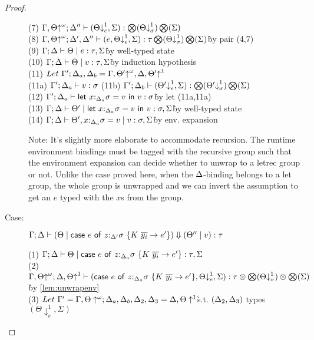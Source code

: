 \documentclass[acmsmall,review,anonymous,screen]{acmart}
\newcommand{\llet}[2]{\mathsf{let}~#1~\mathsf{in}~#2}
\newcommand{\ccase}[2]{\mathsf{case}~#1~\mathsf{of}~#2}
\begin{document}
\begin{proof}
\begin{description}
\begin{tabbing}
    (7) $\Gamma, \Theta{\uparrow}^\omega; \Delta'' \vdash (\Theta{\downarrow}^1_e, \Sigma) : \bigotimes(\Theta{\downarrow}^1_\sigma) \bigotimes(\Sigma)$\\
    (8) $\Gamma, \Theta{\uparrow}^\omega; \Delta', \Delta'' \vdash (e, \Theta{\downarrow}^1_e, \Sigma) : \tau \bigotimes(\Theta{\downarrow}^1_\sigma) \bigotimes(\Sigma)$\` by pair (4,7)\\
    (9) $\Gamma; \Delta \vdash \Theta \mid e : \tau,\Sigma$\` by well-typed state\\
    (10) $\Gamma; \Delta \vdash \Theta \mid v : \tau,\Sigma$\` by induction hypothesis\\
    (11) $Let~\Gamma';\Delta_a,\Delta_b = \Gamma, \Theta'{\uparrow}^\omega, \Delta, \Theta'{\uparrow}^1$\\
    (11a) $\Gamma'; \Delta_a \vdash v : \sigma$
    (11b) $\Gamma'; \Delta_b \vdash (\Theta'{\downarrow}^1_e, \Sigma) : \bigotimes(\Theta'{\downarrow}^1_\sigma) \bigotimes(\Sigma)$\\
    (12) $\G'; \D_a \vdash \llet{x{:}_{\D_a}\s = v}{v} : \s$\`by let (11a,11a)\\
    (13) $\G; \D \vdash \Theta' \mid \llet{x{:}_{\D_a}\s = v}{v} : \s, \Sigma$\`by well-typed state\\
    (14) $\Gamma; \Delta \vdash \Theta', x{:}_{\Delta_a}\sigma = v \mid v : \sigma, \Sigma$\`by env. expansion\\
\end{tabbing}
Note: It's slightly more elaborate to accommodate recursion. The runtime
environment bindings must be tagged with the recursive group such that the
environment expansion can decide whether to unwrap to a letrec group or
not. Unlike the case proved here, when the $\Delta$-binding belongs to a let group,
the whole group is unwrapped and we can invert the assumption to get an
$e$ typed with the $x$s from the group.\\
\item[Case:] $\Gamma; \Delta \vdash (\Theta \mid \ccase{e}{z{:}_{\Delta'}\s~\{K~\ov{y_i}\to e'}\}) \Downarrow (\Theta'' \mid v) : \tau$
\begin{tabbing}
    (1) $\Gamma; \Delta \vdash \Theta \mid \ccase{e}{z{:}_{\Delta_a}\s~\{K~\ov{y_i}\to e'}\} : \tau, \Sigma$\\
    (2) $\G, \Theta{\uparrow}^\omega; \D, \Theta{\uparrow}^1 \vdash (\ccase{e}{z{:}_{\Delta_a}\s~\{K~\ov{y_i}\to e'}\}, \Theta{\downarrow}^1_e, \Sigma) : \tau \otimes \bigotimes(\Theta{\downarrow}^1_\sigma) \otimes \bigotimes(\Sigma)$\`by \ref{lem:unwrapenv}\\
    (3) $Let~\Gamma' = \Gamma, \Theta\uparrow^\omega; \Delta_a,\Delta_b,\Delta_2,\Delta_3 = \Delta,\Theta\uparrow^1$\`s.t. $(\Delta_2,\Delta_3)$ types $(\Theta\downarrow^1_e, \Sigma)$\\

\end{tabbing}
\end{description}
\end{proof}
\end{document}
